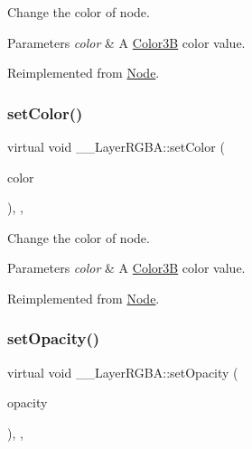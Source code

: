Change the color of node. 
\begin{DoxyParams}{Parameters}
{\em color} & A \hyperlink{structColor3B}{Color3B} color value. \\
\hline
\end{DoxyParams}


Reimplemented from \hyperlink{classNode_af45037de5b13602263b1ce51b50cafdd}{Node}.

\mbox{\label{class____LayerRGBA_aed346ddd9f7f7eab1e3d1417fa9a9831}} 
\subsubsection{\texorpdfstring{set\+Color()}{setColor()}\hspace{0.1cm}{\footnotesize\ttfamily [2/2]}}
{\footnotesize\ttfamily virtual void \+\_\+\+\_\+\+Layer\+R\+G\+B\+A\+::set\+Color (\begin{DoxyParamCaption}\item[{const \hyperlink{structColor3B}{Color3B} \&}]{color }\end{DoxyParamCaption})\hspace{0.3cm}{\ttfamily [inline]}, {\ttfamily [override]}, {\ttfamily [virtual]}}

Change the color of node. 
\begin{DoxyParams}{Parameters}
{\em color} & A \hyperlink{structColor3B}{Color3B} color value. \\
\hline
\end{DoxyParams}


Reimplemented from \hyperlink{classNode_af45037de5b13602263b1ce51b50cafdd}{Node}.

\mbox{\label{class____LayerRGBA_a1b172623ee7486835fd189672d19d8d7}} 
\subsubsection{\texorpdfstring{set\+Opacity()}{setOpacity()}\hspace{0.1cm}{\footnotesize\ttfamily [1/2]}}
{\footnotesize\ttfamily virtual void \+\_\+\+\_\+\+Layer\+R\+G\+B\+A\+::set\+Opacity (\begin{DoxyParamCaption}\item[{G\+Lubyte}]{opacity }\end{DoxyParamCaption})\hspace{0.3cm}{\ttfamily [inline]}, {\ttfamily [override]}, {\ttfamily [virtual]}}

